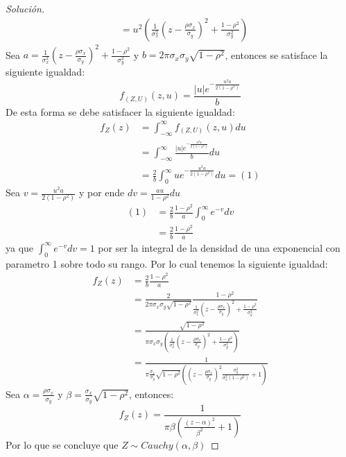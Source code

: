 \documentclass[11pt,notitlepage]{article}
\newenvironment{solucion}
  {\begin{proof}[Solución]}
  {\end{proof}}
\begin{document}
\begin{solucion}
\begin{align*}
       &= u^{2}\left (\frac{1}{\sigma_{x}^2} \left (z - \frac{\rho\sigma_{x}}{\sigma_{y}} \right )^2 +   \frac{1 - \rho^2}{\sigma_{y}^2}\right )   
\end{align*}
Sea \(a =\frac{1}{\sigma_{x}^2} \left (z - \frac{\rho\sigma_{x}}{\sigma_{y}} \right )^2 +   \frac{1 - \rho^2}{\sigma_{y}^2} \) y \(b = 2\pi\sigma_{x}\sigma_{y}\sqrt{1-\rho^2}\), entonces se satisface la siguiente igualdad:
\[f_{(Z,U)}(z,u) = \frac{\left | u \right |e^{-\frac{u^{2}a}{2(1-\rho^2)}}}{b}\]
De esta forma se debe satisfacer la siguiente igualdad: 
\begin{align*}
    f_{Z}(z) &= \int_{-\infty}^{\infty} f_{(Z,U)}(z,u)du \\
             &= \int_{-\infty}^{\infty}\frac{\left | u \right |e^{-\frac{u^{2}a}{2(1-\rho^2)}}}{b}du   \\
             &=\frac{2}{b}\int_{0}^{\infty}ue^{-\frac{u^{2}a}{2(1-\rho^2)}}du = (1)
\end{align*}
Sea \(v = \frac{u^{2}a}{2(1-\rho^2)}\) y por ende \(dv = \frac{au}{1 - \rho^2}du\)
\begin{align*}
        (1)    &= \frac{2}{b}\frac{1-\rho^2}{a}\int_{0}^{\infty}e^{-v}dv\\
               &=\frac{2}{b}\frac{1-\rho^2}{a}
\end{align*}
ya que \(\int_{0}^{\infty}e^{-v}dv = 1\) por ser la integral de la densidad de una exponencial con parametro 1 sobre todo su rango. Por lo cual tenemos la siguiente igualdad: 
\begin{align*}
  f_{Z}(z)  &=  \frac{2}{b}\frac{1-\rho^2}{a} \\
            &= \frac{2}{2\pi\sigma_{x}\sigma_{y}\sqrt{1-\rho^2}}\frac{1-\rho^2}{\frac{1}{\sigma_{x}^2} \left (z - \frac{\rho\sigma_{x}}{\sigma_{y}} \right )^2 +   \frac{1 - \rho^2}{\sigma_{y}^2}}  \\
            &=\frac{\sqrt{1-\rho^2}}{\pi\sigma_{x}\sigma_{y}\left ( \frac{1}{\sigma_{x}^2} \left (z - \frac{\rho\sigma_{x}}{\sigma_{y}} \right )^2 +   \frac{1 - \rho^2}{\sigma_{y}^2} \right )}\\
            &= \frac{1}{\pi\frac{\sigma_{x}}{\sigma_{y}}\sqrt{1-\rho^2}\left (  \left (z - \frac{\rho\sigma_{x}}{\sigma_{y}} \right )^2\frac{\sigma_{y}^2}{\sigma_{x}^2(1-\rho^2)} +  1 \right )}
\end{align*}
Sea \(\alpha  = \frac{\rho\sigma_{x}}{\sigma_{y}}\) y \(\beta = \frac{\sigma_{x}}{\sigma_{y}}\sqrt{1-\rho^2}\), entonces: 
\[f_{Z}(z) =  \frac{1}{\pi\beta\left ( \frac{\left ( z - \alpha \right )^2}{\beta^2} + 1\right )}\]
Por lo que se concluye que \(Z \sim Cauchy(\alpha,\beta)\)
\end{solucion}
\end{document}

